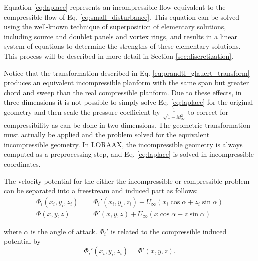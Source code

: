 \documentclass[11pt]{article}
\begin{document}
Equation \ref{eq:laplace} represents an incompressible flow equivalent to the
compressible flow of Eq. \ref{eq:small_disturbance}. This equation can be solved
using the well-known technique of superposition of elementary solutions,
including source and doublet panels and vortex rings, and results in a linear
system of equations to determine the strengths of these elementary solutions.
This process will be described in more detail in
Section \ref{sec:discretization}.

Notice that the
transformation described in Eq. \ref{eq:prandtl_glauert_transform} produces
an equivalent incompressible planform with the same span but greater chord and
sweep than the real compressible planform. Due to these effects, in three
dimensions it is not possible to simply solve Eq. \ref{eq:laplace} for the
original geometry and then scale the pressure coefficient by
$\frac{1}{\sqrt{1 - M_\infty^2}}$ to correct for compressibility as
can be done in two dimensions. The geometric transformation must actually be
applied and the problem solved for the equivalent incompressible geometry. In
LORAAX, the incompressible geometry is always computed as a preprocessing step,
and Eq. \ref{eq:laplace} is solved in incompressible coordinates.

The velocity potential for the either the incompressible or compressible problem
can be separated into a freestream and induced part as follows:
\begin{align}
	\label{eq:phi_sep}
	\Phi_i(x_i,y_i,z_i) & = \Phi_i'(x_i,y_i,z_i)
	                      + U_\infty(x_i\cos\alpha + z_i\sin\alpha) \\ \nonumber
	\Phi(x,y,z) & = \Phi'(x,y,z)
	              + U_\infty(x\cos\alpha + z\sin\alpha) \nonumber
\end{align}

\noindent where $\alpha$ is the angle of attack. $\Phi_i'$ is related to the
compressible induced potential by
\begin{equation}
	\Phi_i'(x_i,y_i,z_i) = \Phi'(x,y,z).
	\label{eq:phiprime_incompressible}
\end{equation}
\end{document}
